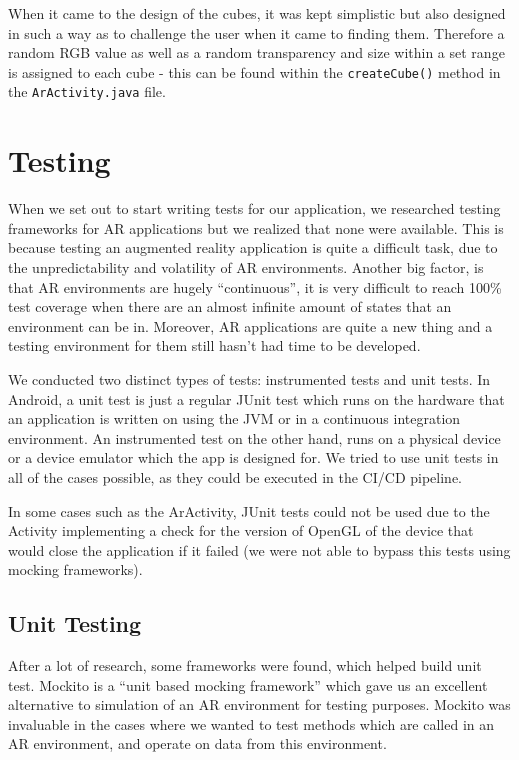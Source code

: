 \documentclass{l3proj}
\begin{document}
When it came to the design of the cubes, it was kept simplistic but also designed in such a way as to challenge the user when it came to finding them. Therefore a random RGB value as well as a random transparency and size within a set range is assigned to each cube - this can be found within the \verb|createCube()| method in the \verb|ArActivity.java| file.

\section{Testing}
When we set out to start writing tests for our application, we researched testing 
frameworks for AR applications but we realized that none were available.
This is because testing an augmented reality application is quite a difficult task, 
due to the unpredictability and volatility of AR environments. 
Another big factor, is that AR environments are hugely “continuous”, it is 
very difficult to reach 100\% test coverage when there are an almost infinite 
amount of states that an environment can be in. Moreover, AR applications are
quite a new thing and a testing environment for them still hasn't had time to
be developed\cite{ArTesting}.

We conducted two distinct types of tests: instrumented tests and unit tests. 
In Android, a unit test is just a regular JUnit test which runs on the hardware that an application is 
written on using the JVM or in a continuous integration environment. 
An instrumented test on the other hand, runs on a physical device or a device 
emulator which the app is designed for\cite{AndroidTests}. We tried to use unit 
tests in all of the cases possible, as they could be executed in the CI/CD pipeline. 

In some cases such as the ArActivity, JUnit tests could not be used due to the Activity
implementing a check for the version of OpenGL of the device that would close the
application if it failed (we were not able to bypass this tests using mocking frameworks).

\subsection{Unit Testing}
After a lot of research, some frameworks were found, which helped build unit test.
Mockito is a “unit based mocking framework”\cite{Mockito} which gave us an excellent alternative 
to simulation of an AR environment for testing purposes. Mockito was invaluable in 
the cases where we wanted to test methods which are called in an AR environment, 
and operate on data from this environment.
\end{document}
